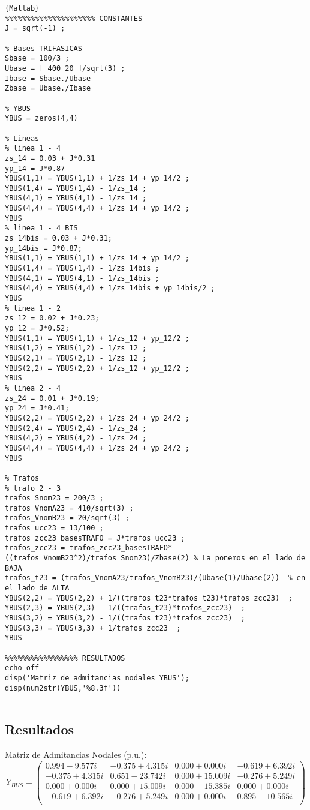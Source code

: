 \documentclass[a4paper,10pt,titlepage,oneside]{article}
\begin{document}
{\begin{lstlisting}[frame=lines]{Matlab}
%%%%%%%%%%%%%%%%%%%%% CONSTANTES
J = sqrt(-1) ;

% Bases TRIFASICAS
Sbase = 100/3 ;
Ubase = [ 400 20 ]/sqrt(3) ;
Ibase = Sbase./Ubase 
Zbase = Ubase./Ibase 

% YBUS
YBUS = zeros(4,4)

% Lineas
% linea 1 - 4
zs_14 = 0.03 + J*0.31
yp_14 = J*0.87
YBUS(1,1) = YBUS(1,1) + 1/zs_14 + yp_14/2 ;
YBUS(1,4) = YBUS(1,4) - 1/zs_14 ; 
YBUS(4,1) = YBUS(4,1) - 1/zs_14 ; 
YBUS(4,4) = YBUS(4,4) + 1/zs_14 + yp_14/2 ; 
YBUS
% linea 1 - 4 BIS
zs_14bis = 0.03 + J*0.31;
yp_14bis = J*0.87;
YBUS(1,1) = YBUS(1,1) + 1/zs_14 + yp_14/2 ;
YBUS(1,4) = YBUS(1,4) - 1/zs_14bis ; 
YBUS(4,1) = YBUS(4,1) - 1/zs_14bis ; 
YBUS(4,4) = YBUS(4,4) + 1/zs_14bis + yp_14bis/2 ; 
YBUS
% linea 1 - 2
zs_12 = 0.02 + J*0.23;
yp_12 = J*0.52;
YBUS(1,1) = YBUS(1,1) + 1/zs_12 + yp_12/2 ;
YBUS(1,2) = YBUS(1,2) - 1/zs_12 ; 
YBUS(2,1) = YBUS(2,1) - 1/zs_12 ; 
YBUS(2,2) = YBUS(2,2) + 1/zs_12 + yp_12/2 ; 
YBUS
% linea 2 - 4
zs_24 = 0.01 + J*0.19;
yp_24 = J*0.41;
YBUS(2,2) = YBUS(2,2) + 1/zs_24 + yp_24/2 ;
YBUS(2,4) = YBUS(2,4) - 1/zs_24 ; 
YBUS(4,2) = YBUS(4,2) - 1/zs_24 ; 
YBUS(4,4) = YBUS(4,4) + 1/zs_24 + yp_24/2 ; 
YBUS

% Trafos
% trafo 2 - 3
trafos_Snom23 = 200/3 ;
trafos_VnomA23 = 410/sqrt(3) ;
trafos_VnomB23 = 20/sqrt(3) ;
trafos_ucc23 = 13/100 ;
trafos_zcc23_basesTRAFO = J*trafos_ucc23 ; 
trafos_zcc23 = trafos_zcc23_basesTRAFO*((trafos_VnomB23^2)/trafos_Snom23)/Zbase(2) % La ponemos en el lado de BAJA
trafos_t23 = (trafos_VnomA23/trafos_VnomB23)/(Ubase(1)/Ubase(2))  % en el lado de ALTA
YBUS(2,2) = YBUS(2,2) + 1/((trafos_t23*trafos_t23)*trafos_zcc23)  ;
YBUS(2,3) = YBUS(2,3) - 1/((trafos_t23)*trafos_zcc23)  ; 
YBUS(3,2) = YBUS(3,2) - 1/((trafos_t23)*trafos_zcc23)  ; 
YBUS(3,3) = YBUS(3,3) + 1/trafos_zcc23  ;  
YBUS

%%%%%%%%%%%%%%%%% RESULTADOS
echo off
disp('Matriz de admitancias nodales YBUS');
disp(num2str(YBUS,'%8.3f'))


\end{lstlisting}
\subsection{Resultados}
\noindent
Matriz de Admitancias Nodales (p.u.):
\begin{equation}
    Y_{BUS} = \begin{pmatrix}
     0.994-9.577i & -0.375+4.315i &   0.000+0.000i &  -0.619+6.392i\\ 
    -0.375+4.315i &  0.651-23.742i &  0.000+15.009i & -0.276+5.249i \\
     0.000+0.000i &  0.000+15.009i &  0.000-15.385i &  0.000+0.000i \\
    -0.619+6.392i & -0.276+5.249i &   0.000+0.000i  &  0.895-10.565i\\
    \end{pmatrix}
\end{equation}

}
\end{document}
